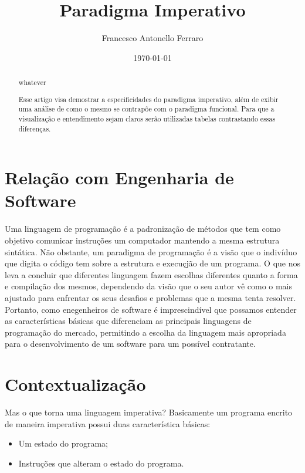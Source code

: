 \documentclass[11pt]{article}
\author{Francesco Antonello Ferraro}
\date{\today}
\title{Paradigma Imperativo}
\begin{document}
\maketitle
{}
\begin{abstract}
whatever
\end{abstract}
\begin{abstract}
Esse artigo visa demostrar a especificidades do paradigma imperativo, além de exibir uma análise de como o mesmo se contrapõe com o paradigma funcional. Para que a visualização e entendimento sejam claros serão utilizadas tabelas contrastando essas diferenças.
\end{abstract}



\section{Relação com Engenharia de Software}
\label{sec:orga038d97}

Uma linguagem de programação é a padronização de métodos que tem como objetivo comunicar instruções um computador mantendo a mesma estrutura sintática. Não obstante, um paradigma de programação é a visão que o indivíduo que digita o código tem sobre a estrutura e execuçjão de um programa. O que nos leva a concluir que diferentes linguagem fazem escolhas diferentes quanto a forma e compilação dos mesmos, dependendo da visão que o seu autor vê como o mais ajustado para enfrentar os seus desafios e problemas que a mesma tenta resolver. Portanto, como enegenheiros de software é imprescindível que possamos entender as características básicas que diferenciam as principais linguagens de programação do mercado, permitindo a escolha da linguagem mais apropriada para o desenvolvimento de um software para um possível contratante.

\section{Contextualização}
\label{sec:orgd977f5e}

Mas o que torna uma linguagem imperativa? Basicamente um programa encrito de maneira imperativa possui duas característica básicas:

\begin{itemize}
\item Um estado do programa;
\item Instruções que alteram o estado do programa.
\end{itemize}
\end{document}
